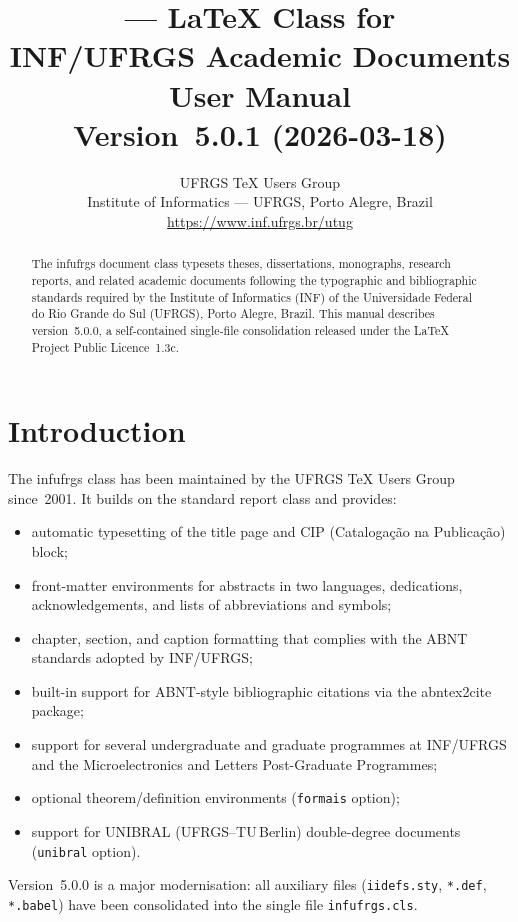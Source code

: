 \documentclass[11pt,a4paper]{article}
\title{%
  \pkg{infufrgs} — LaTeX Class for\\[4pt]
  INF/UFRGS Academic Documents\\[8pt]
  \large\normalfont User Manual\\[4pt]
  \large\normalfont Version~5.0.1 (2026-03-18)}
\author{UFRGS TeX Users Group\\
  \small Institute of Informatics — UFRGS, Porto Alegre, Brazil\\
  \small\url{https://www.inf.ufrgs.br/utug}}
\date{}
\newcommand{\pkg}[1]{\textsf{#1}}
\newcommand{\cls}[1]{\textsf{#1}}
\newcommand{\opt}[1]{\texttt{#1}}
\newcommand{\file}[1]{\texttt{#1}}
\begin{document}

\maketitle
\thispagestyle{empty}

\begin{abstract}
  \noindent
  The \cls{infufrgs} document class typesets theses, dissertations,
  monographs, research reports, and related academic documents following
  the typographic and bibliographic standards required by the Institute
  of Informatics (INF) of the Universidade Federal do Rio Grande do Sul
  (UFRGS), Porto Alegre, Brazil.  This manual describes version~5.0.0,
  a self-contained single-file consolidation released under the
  LaTeX Project Public Licence~1.3c.
\end{abstract}

\tableofcontents

\section{Introduction}

The \cls{infufrgs} class has been maintained by the UFRGS TeX Users Group
since~2001.  It builds on the standard \cls{report} class and provides:
%
\begin{itemize}
  \item automatic typesetting of the title page and CIP
        (Catalogação na Publicação) block;
  \item front-matter environments for abstracts in two languages,
        dedications, acknowledgements, and lists of abbreviations
        and symbols;
  \item chapter, section, and caption formatting that complies with
        the ABNT standards adopted by INF/UFRGS;
  \item built-in support for ABNT-style bibliographic citations via
        the \pkg{abntex2cite} package;
  \item support for several undergraduate and graduate programmes
        at INF/UFRGS and the Microelectronics and Letters
        Post-Graduate Programmes;
  \item optional theorem/definition environments (\opt{formais} option);
  \item support for UNIBRAL (UFRGS–TU\,Berlin) double-degree documents
        (\opt{unibral} option).
\end{itemize}
%
Version~5.0.0 is a major modernisation: all auxiliary files
(\file{iidefs.sty}, \file{*.def}, \file{*.babel}) have been
consolidated into the single file \file{infufrgs.cls}.
\end{document}
